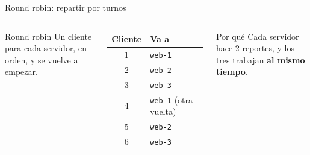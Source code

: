 \documentclass[aspectratio=169,10pt,c]{beamer}
\begin{document}
\begin{frame}{Round robin: repartir por turnos}
\begin{columns}[c,onlytextwidth]
\begin{block}{Round robin}
\small Un cliente para cada servidor, en orden, y se vuelve a empezar.
\end{block}
\renewcommand{\arraystretch}{1.15}
\centering\small
\begin{tabular}{@{}cl@{}}
\toprule
\textbf{Cliente} & \textbf{Va a}\\
\midrule
1 & \texttt{web-1}\\
2 & \texttt{web-2}\\
3 & \texttt{web-3}\\
\rowcolor{utpRojo!20} 4 & \texttt{web-1} {\color{utpGris}\scriptsize(otra vuelta)}\\
5 & \texttt{web-2}\\
6 & \texttt{web-3}\\
\bottomrule
\end{tabular}
\par\vspace{4mm}
\par\vspace{5mm}
\begin{alertblock}{Por qué}
\small Cada servidor hace 2 reportes, y los tres trabajan \textbf{al mismo tiempo}.
\end{alertblock}
\end{columns}
\end{frame}
\end{document}
